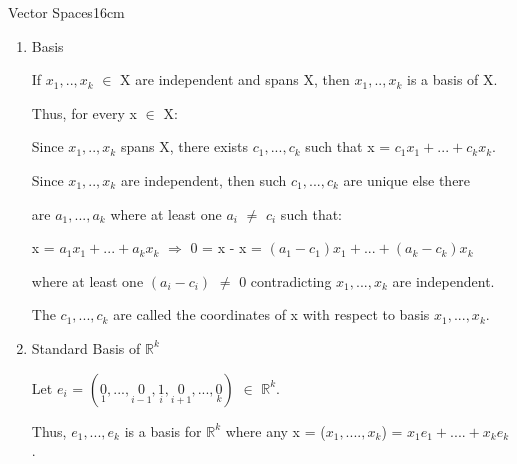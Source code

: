 \begin{definition}{Vector Spaces}{16cm}
\begin{enumerate}[label=(\alph*), leftmargin=0.5cm, itemsep=0.1cm]
                \vspace{0.2cm}

                If vector space X have r independent vectors, but not r+1
                independent vectors, then dim(X) = r.
                The set \{0\} has dimension 0.

            \item {\color{lblue} Basis}
                
                If $x_1,..,x_k$ $\in$ X are independent and spans X, then
                $x_1,..,x_k$ is a basis of X.

                Thus, for every x $\in$ X:

                \hspace{0.5cm}
                Since $x_1,..,x_k$ spans X, there exists $c_1,...,c_k$ such that
                x = $c_1x_1 + ... + c_kx_k$.

                \hspace{0.5cm}
                Since $x_1,..,x_k$ are independent, then such $c_1,...,c_k$
                are unique else there
                
                \hspace{0.5cm}
                are $a_1,...,a_k$ where at least one
                $a_i$ $\not =$ $c_i$ such that:

                \hspace{1cm}
                x = $a_1x_1 + ... + a_kx_k$
                \hspace{0.5cm}
                $\Rightarrow$
                \hspace{0.5cm}
                0 = x - x = $(a_1-c_1)x_1 + ... + (a_k-c_k)x_k$

                \hspace{0.5cm}
                where at least one $(a_i - c_i)$ $\not =$ 0
                contradicting $x_1,...,x_k$ are independent.

                The $c_1,...,c_k$ are called the coordinates of x
                with respect to basis $x_1,...,x_k$.

            \item Standard Basis of $\mathbb{R}^k$
            
                Let $e_i$
                = $(\underset{\scriptscriptstyle 1}{0},...,
                    \underset{\scriptscriptstyle i-1}{0},
                    \underset{\scriptscriptstyle i}{1},
                    \underset{\scriptscriptstyle i+1}{0},...,
                    \underset{\scriptscriptstyle k}{0})$
                $\in$ $\mathbb{R}^k$.

                Thus, $e_1,...,e_k$ is a basis for $\mathbb{R}^k$
                where any x = ($x_1,....,x_k$) = $x_1e_1 + .... + x_ke_k$.
        \end{enumerate}
    \end{definition}

